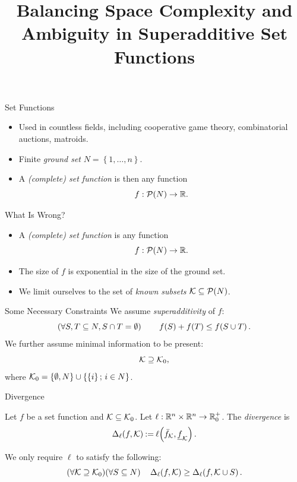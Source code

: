 \documentclass[aspectratio=169]{beamer}
\title{Balancing Space Complexity and Ambiguity in Superadditive Set Functions}
\begin{document}
\maketitle

\begin{frame}{Set Functions}
	\begin{itemize}
		\item<1-> Used in countless fields, including cooperative game theory, combinatorial auctions, matroids.
		\item<2-> Finite \emph{ground set} $ N = \left\{ 1, \ldots, n \right\} $.
		\item<3-> A \emph{(complete) set function} is then any function \[
			f: \mathcal{P}\!\left(N\right) \to \mathbb{R}.
		\]
	\end{itemize}
\end{frame}

\begin{frame}{What Is Wrong?}
	\begin{itemize}[ ]
		\item<1-> A \emph{(complete) set function} is any function \[
				f: \mathcal{P}\!\left(N\right) \to \mathbb{R}.
			\]
		\item<2-> The size of $ f $ is exponential in the size of the ground set.
		\item<3-> We limit ourselves to the set of \emph{known subsets} $ \mathcal{K} \subseteq \mathcal{P}\!\left(N\right) $.
	\end{itemize}
	
\end{frame}

\begin{frame}{Some Necessary Constraints}
	We assume \emph{superadditivity} of $ f $: \[
		\left( \forall S,T \subseteq N, S \cap T = \emptyset \right)\qquad f\!\left(S\right) + f\!\left(T\right) \leq f\!\left(S \cup T\right).
	\]
	We further assume minimal information to be present: \[
		\mathcal{K} \supseteq \mathcal{K}_0,
	\]
	where $ \mathcal{K}_0 = \left\{ \emptyset, N \right\} \cup \left\{ \left\{ i \right\} ;\, i \in N \right\} $.
\end{frame}



\begin{frame}{Divergence}
	\begin{definition}[Divergence]
		Let $ f $ be a set function and $ \mathcal{K} \subseteq \mathcal{K}_0 $.
		Let $ \ell: \mathbb{R}^n \times \mathbb{R}^n \to \mathbb{R}^+_0 $.
		The \emph{divergence} is \[
			\Delta_\ell\!\left(f, \mathcal{K}\right) \mathbin{:=} \ell\!\left(\bar f_{\mathcal{K}}, \underline f_{\mathcal{K}}\right).
		\]
	\end{definition}
	
	\vspace{2em}
	We only require $ \ell $ to satisfy the following: \[
		\left( \forall \mathcal{K} \supseteq \mathcal{K}_0 \right)\! \left( \forall S \subseteq N \right)\quad \Delta_\ell\!\left(f, \mathcal{K}\right) \geq \Delta_\ell\!\left(f, \mathcal{K} \cup S\right).
	\]
\end{frame}
\end{document}
